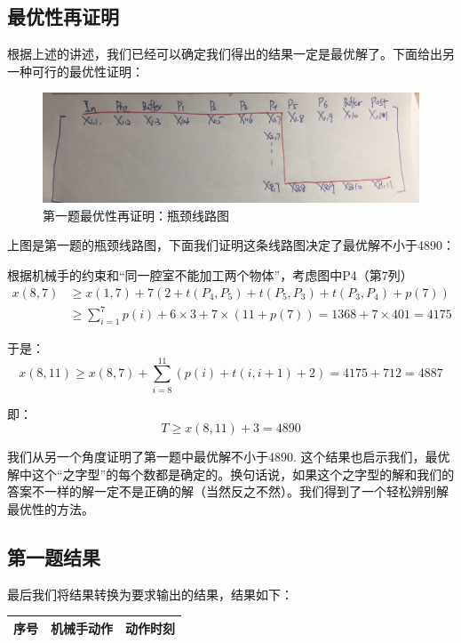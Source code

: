 \documentclass{ctexart}
\begin{document}
{	\subsection{最优性再证明}
	{
		根据上述的讲述，我们已经可以确定我们得出的结果一定是最优解了。下面给出另一种可行的最优性证明：
		
		\begin{figure}[H]
			\centering
			\includegraphics[width = 0.9\linewidth]{proof2.jpg}
			\caption{第一题最优性再证明：瓶颈线路图}
		\end{figure}
	
		上图是第一题的瓶颈线路图，下面我们证明这条线路图决定了最优解不小于4890：
		
		根据机械手的约束和“同一腔室不能加工两个物体”，考虑图中P4（第7列）
		$$
		\begin{aligned}
			x(8,7) &\ge x(1,7)+7(2+t(P_4,P_5)+t(P_5,P_3)+t(P_3,P_4)+p(7)) \\
			&\ge \sum_{i=1}^7 p(i)+6\times3+7\times(11+p(7))=1368+7\times 401 =4175
		\end{aligned}
		$$
		
		于是：
		$$
		x(8,11) \ge x(8,7)+ \sum_{i=8}^11 (p(i)+t(i,i+1)+2)=4175+712=4887
		$$
		
		即：
		$$
		T \ge x(8,11)+3=4890
		$$
		
		我们从另一个角度证明了第一题中最优解不小于4890. 这个结果也启示我们，最优解中这个“之字型”的每个数都是确定的。换句话说，如果这个之字型的解和我们的答案不一样的解一定不是正确的解（当然反之不然）。我们得到了一个轻松辨别解最优性的方法。
	}

    \subsection{第一题结果}
    {
		最后我们将结果转换为要求输出的结果，结果如下：

        \begin{longtable}{clc}
	
            \toprule
            序号& 机械手动作& 动作时刻\\
            \midrule 
        

\end{longtable}}}
\end{document}
